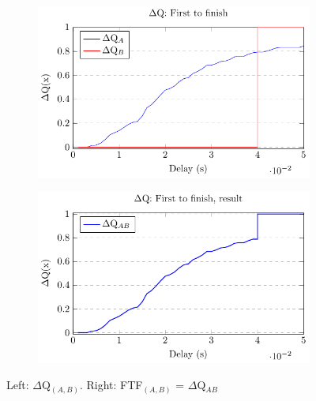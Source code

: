        \begin{figure}[H]
            \centering
            \begin{subfigure}{.5\textwidth}
                \centering
                \includegraphics[scale = 0.7]{tikz/ftf_1.pdf}
                \label{fig:ftf1}
            \end{subfigure}%
            \begin{subfigure}{.5\textwidth}
                \centering
                \includegraphics[scale = 0.7]{tikz/ftf_2.pdf}
                \label{fig:ftf2}
            \end{subfigure}
            \caption{Left: $\Delta$Q$_{(A, B)}$. Right: FTF$_{(A, B)}$ = $\Delta$Q$_{AB}$}%
            \label{fig:ftf}
            \end{figure}



